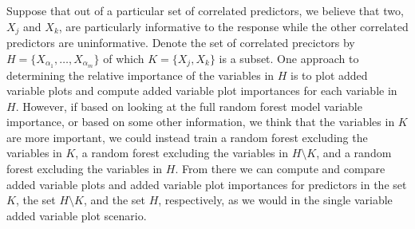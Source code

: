 \documentclass[12pt,twoside]{reedthesis}
\theoremstyle{definition}
\theoremstyle{definition}
\theoremstyle{definition}
\theoremstyle{remark}
\begin{document}
Suppose that out of a particular set of correlated predictors, we
believe that two, \(X_j\) and \(X_k\), are particularly informative to
the response while the other correlated predictors are uninformative.
Denote the set of correlated precictors by
\(H=\{X_{\alpha_1},\ldots,X_{\alpha_m}\}\) of which \(K=\{X_j,X_k\}\) is
a subset. One approach to determining the relative importance of the
variables in \(H\) is to plot added variable plots and compute added
variable plot importances for each variable in \(H\). However, if based
on looking at the full random forest model variable importance, or based
on some other information, we think that the variables in \(K\) are more
important, we could instead train a random forest excluding the
variables in \(K\), a random forest excluding the variables in
\(H\setminus K\), and a random forest excluding the variables in \(H\).
From there we can compute and compare added variable plots and added
variable plot importances for predictors in the set \(K\), the set
\(H\setminus K\), and the set \(H\), respectively, as we would in the
single variable added variable plot scenario. \par
\end{document}
